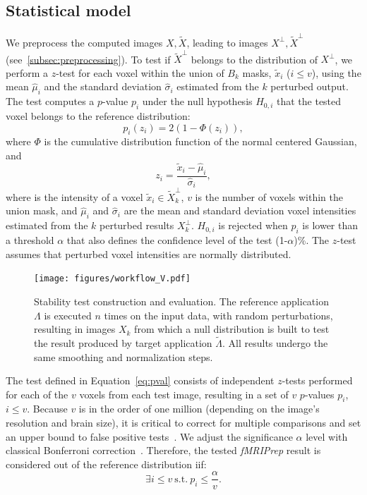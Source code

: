 \documentclass[lettersize,journal]{IEEEtran}
\newcommand{\fmriprep}{\emph{fMRIPrep}\xspace}
\begin{document}
{\subsection{Statistical model}
\label{subsec:statistical_model}

We preprocess the computed images $X,\tilde X$, leading to images $X^\perp, \tilde X^\perp$ (see~\ref{subsec:preprocessing}). To test if $\tilde X^\perp$ belongs to the distribution of $X^\perp$, we perform a $z$-test for each voxel within the union of $B_k$ masks, $\tilde x_i$ ($i\leq v$), using the mean $\hat \mu_i$ and the standard deviation $\hat \sigma_i$ estimated from the $k$ perturbed output.
The test computes a $p$-value $p_i$ under the null hypothesis $H_{0,i}$ that the tested voxel belongs to the reference distribution:
\begin{equation} \label{eq:pval}
  p_i(z_i) = 2 \left(1-\Phi(z_i)\right),
\end{equation}
where $\Phi$ is the cumulative distribution function of the normal centered Gaussian, and
\begin{equation*}
  z_i = \frac{\tilde x_i-\hat \mu_i}{\hat \sigma_i},
\end{equation*}
where is the intensity of a voxel $\tilde x_i \in \tilde X_k^\perp$, $v$ is the number of voxels within the union mask,
and $\hat \mu_i$ and $\hat \sigma_i$ are the mean and standard deviation voxel intensities estimated
from the $k$ perturbed results $X_k^\perp$.
$H_{0,i}$ is rejected when $p_i$ is lower than a threshold $\alpha$ that also defines the confidence level of the test (1-$\alpha$)\%.
The $z$-test assumes that perturbed voxel intensities are normally distributed.

\begin{figure}
  \centering
  \texttt{[image: figures/workflow\_V.pdf]}
  \caption{Stability test construction and evaluation. The reference application $\Lambda$ is executed $n$ times on the input data, with random perturbations, resulting in images $X_k$ from which a null distribution is built to test the result produced by target application $\tilde \Lambda$. All results undergo the same smoothing and normalization steps.}
  \label{fig:test_workflow}
\end{figure}


The test defined in Equation~\ref{eq:pval} consists of independent $z$-tests performed for each of the $v$ voxels
from each test image, resulting in a set of $v$ $p$-values $p_i$, $i \leq v$.
Because $v$ is in the order of one million (depending on the image's resolution and brain size), it is critical
to correct for multiple comparisons and set an upper bound to false positive tests~\cite{NICHOLS2007246}.
We adjust the significance $\alpha$ level with classical Bonferroni correction~\cite{farcomeni2008review}.
Therefore, the tested \fmriprep result is considered out of the reference distribution iif:
\begin{equation}
  \label{eq:bonferroni}
  \exists i \leq v \ \text{s.t.} \ p_i \leq \frac{\alpha}{v}.
\end{equation}


}
\end{document}
